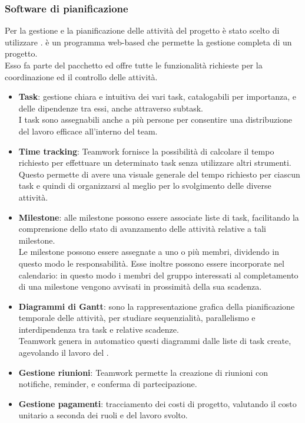 \subsubsection{Software di pianificazione} \label{sec:teamwork}
Per la gestione e la pianificazione delle attività del progetto è stato scelto di utilizzare \textbf{}.  è un programma web-based che permette la gestione completa di un progetto.\\
Esso fa parte del pacchetto  ed offre tutte le funzionalità richieste per la coordinazione ed il controllo delle attività.
\begin{itemize}
	\item \textbf{Task}:
	gestione chiara e intuitiva dei vari task, catalogabili per importanza, e delle dipendenze tra essi, anche attraverso subtask.\\
	I task sono assegnabili anche a più persone per consentire una distribuzione del lavoro efficace all'interno del team.
	
	\item \textbf{Time tracking}:
	Teamwork fornisce la possibilità di calcolare il tempo richiesto per effettuare un determinato task senza utilizzare altri strumenti. Questo permette di avere una visuale generale del tempo richiesto per ciascun task e quindi di organizzarsi al meglio per lo svolgimento delle diverse attività.
	
	\item \textbf{Milestone}:
	alle milestone possono essere associate liste di task, facilitando la comprensione dello stato di avanzamento delle attività relative a tali milestone.\\
	Le milestone possono essere assegnate a uno o più membri, dividendo in questo modo le responsabilità. Esse inoltre possono essere incorporate nel calendario: in questo modo i membri del gruppo interessati al completamento di una milestone vengono avvisati in prossimità della sua scadenza.
	
	\item \textbf{Diagrammi di Gantt}:	
	sono la rappresentazione grafica della pianificazione temporale delle attività, per studiare sequenzialità, parallelismo e interdipendenza tra task e relative scadenze.\\
	Teamwork genera in automatico questi diagrammi dalle liste di task create, agevolando il lavoro del \Responsabile.
	
	\item \textbf{Gestione riunioni}:
	Teamwork permette la creazione di riunioni con notifiche, reminder, e conferma di partecipazione.
	
	\item \textbf{Gestione pagamenti}:
	tracciamento dei costi di progetto, valutando il costo unitario a seconda dei ruoli e del lavoro svolto.
\end{itemize}

